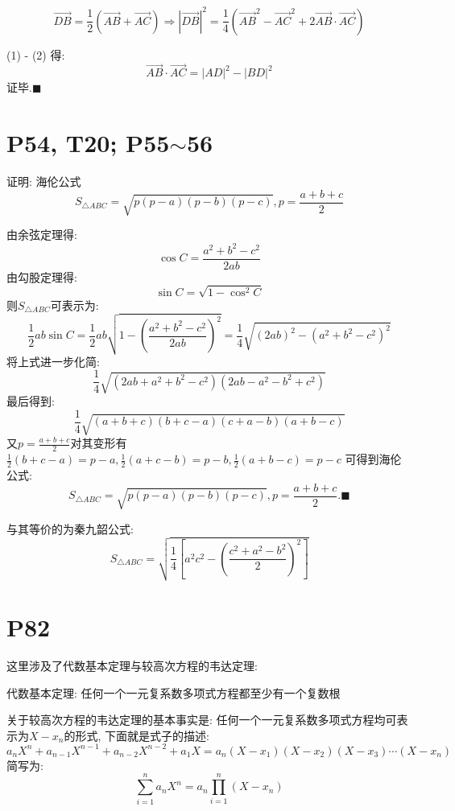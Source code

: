 \documentclass{book}
\begin{document}
    \begin{equation}
        \overrightarrow{DB}=\frac{1}{2} \left ( \overrightarrow{AB}+\overrightarrow{AC} \right )\Longrightarrow |\overrightarrow{DB}|^2=\frac{1}{4}\left ( \overrightarrow{AB}^2-\overrightarrow{AC}^2+2\overrightarrow{AB}\cdot \overrightarrow{AC} \right )
    \end{equation}

    (1) - (2) 得:
    $$
        \overrightarrow{AB}\cdot \overrightarrow{AC}=|AD|^2-|BD|^2
    $$
    证毕.$\blacksquare$
    \section{\textcolor[rgb]{0.11,0.65,0.52}{P54, T20; P55$\sim$56}}
    \begin{boxB}
        证明: \textcolor[rgb]{0.38,0.11,0.2}{海伦公式}
        $$S_{\triangle ABC}=\sqrt{p(p-a)(p-b)(p-c)},p=\frac{a+b+c}{2}$$
    \end{boxB}
    由余弦定理得:
    $$\cos C=\frac{a^2+b^2-c^2}{2ab}$$
    由勾股定理得:
    $$\sin C = \sqrt{1-\cos^2 C}$$
    则$S_{\triangle ABC}$可表示为:
    $$\frac{1}{2}ab\sin C=\frac{1}{2}ab\sqrt{1-\left( \frac{a^2+b^2-c^2}{2ab}\right)^2}=\frac{1}{4}\sqrt{\left(2ab\right)^2-\left( a^2+b^2-c^2 \right)^2}$$
    将上式进一步化简:
    $$\frac{1}{4}\sqrt{\left( 2ab+a^2+b^2-c^2 \right)\left( 2ab-a^2-b^2+c^2 \right)}$$
    最后得到:
    $$\frac{1}{4}\sqrt{\left( a+b+c \right)\left( b+c-a \right)\left( c+a-b \right)\left( a+b-c \right)}$$
    又$\displaystyle p=\frac{a+b+c}{2}$对其变形有$\displaystyle \frac{1}{2}(b+c-a)=p-a,\frac{1}{2}(a+c-b)=p-b,\frac{1}{2}(a+b-c)=p-c$
    可得到海伦公式:
    $$
        S_{\triangle ABC}=\sqrt{p(p-a)(p-b)(p-c)},p=\frac{a+b+c}{2} .\blacksquare
    $$

    与其等价的为\textcolor[rgb]{0.38,0.11,0.2}{秦九韶公式}:
    $$S_{\triangle ABC}=\sqrt{\frac{1}{4}\left[ a^2c^2-\left( \frac{c^2+a^2-b^2}{2} \right)^2 \right]}$$
    \section{\textcolor[rgb]{0.11,0.65,0.52}{P82}}
    这里涉及了\textcolor[rgb]{0.38,0.11,0.2}{代数基本定理}与\textcolor[rgb]{0.38,0.11,0.2}{较高次方程的韦达定理}:
    \begin{boxB}
        代数基本定理: 任何一个一元复系数多项式方程都至少有一个复数根
    \end{boxB}
    关于较高次方程的韦达定理的基本事实是: 任何一个一元复系数多项式方程均可表示为$X-x_n$的形式, 下面就是式子的描述:
    $$a_nX^n+a_{n-1}X^{n-1}+a_{n-2}X^{n-2}+a_1X=a_n(X-x_1)(X-x_2)(X-x_3)\cdots (X-x_n)$$
    简写为:
    $$\sum_{i=1}^{n} a_nX^{n}=a_n\prod_{i=1}^{n}\left ( X-x_n \right ) $$
\end{document}
